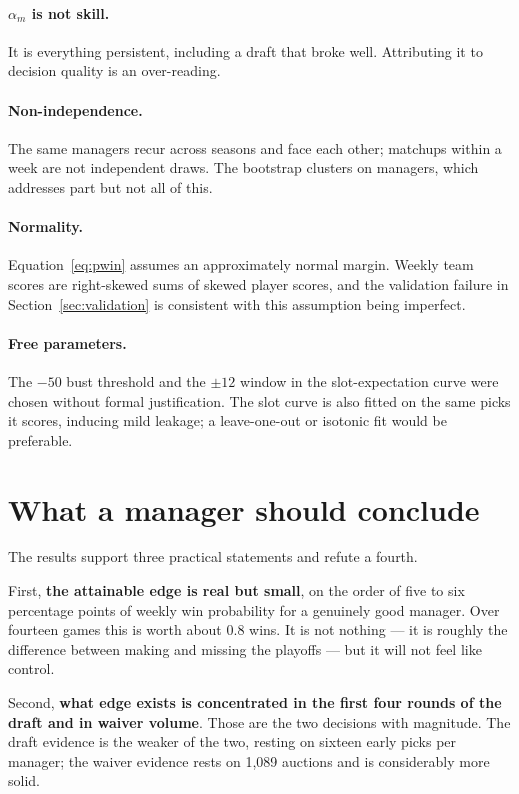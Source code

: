 \documentclass[11pt]{article}
\begin{document}
\paragraph{$\alpha_m$ is not skill.} It is everything persistent, including a
draft that broke well. Attributing it to decision quality is an over-reading.

\paragraph{Non-independence.} The same managers recur across seasons and face
each other; matchups within a week are not independent draws. The bootstrap
clusters on managers, which addresses part but not all of this.

\paragraph{Normality.} Equation~\eqref{eq:pwin} assumes an approximately normal
margin. Weekly team scores are right-skewed sums of skewed player scores, and
the validation failure in Section~\ref{sec:validation} is consistent with this
assumption being imperfect.

\paragraph{Free parameters.} The $-50$ bust threshold and the $\pm 12$ window in
the slot-expectation curve were chosen without formal justification. The slot
curve is also fitted on the same picks it scores, inducing mild leakage; a
leave-one-out or isotonic fit would be preferable.

\section{What a manager should conclude}

The results support three practical statements and refute a fourth.

First, \textbf{the attainable edge is real but small}, on the order of five to
six percentage points of weekly win probability for a genuinely good manager.
Over fourteen games this is worth about $0.8$ wins. It is not nothing --- it is
roughly the difference between making and missing the playoffs --- but it will
not feel like control.

Second, \textbf{what edge exists is concentrated in the first four rounds of the
draft and in waiver volume}. Those are the two decisions with magnitude. The
draft evidence is the weaker of the two, resting on sixteen early picks per
manager; the waiver evidence rests on 1{,}089 auctions and is considerably more
solid.
\end{document}
